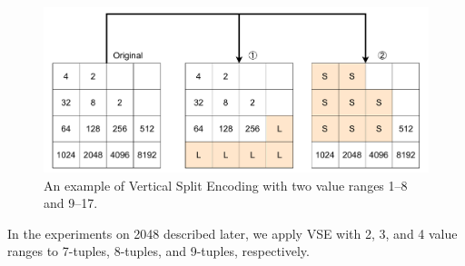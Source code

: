 \begin{figure}
 \includegraphics[width=.9\linewidth]{figures/VSE-example.pdf}
 \caption{An example of Vertical Split Encoding with two value ranges 1--8 and 9--17.}
 \label{fig:VSE-example}
\end{figure}


In the experiments on 2048 described later, we apply VSE with 2, 3, and 4 value ranges to 7-tuples, 8-tuples, and 9-tuples, respectively.

